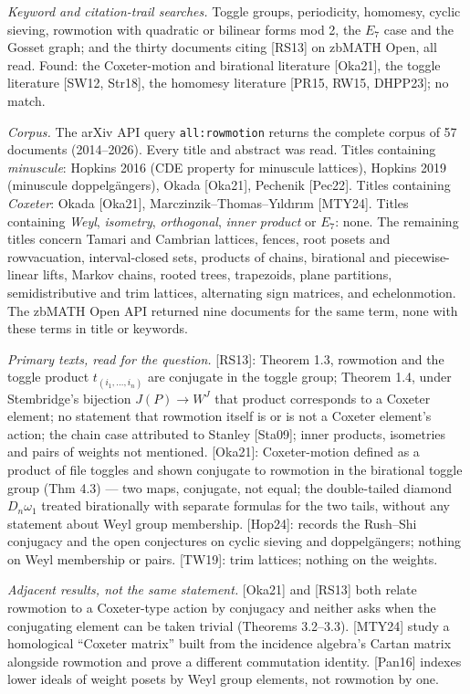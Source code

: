 \documentclass[
]{article}
\newcounter{none} %
\begin{document}
\emph{Keyword and citation-trail searches.} Toggle groups, periodicity,
homomesy, cyclic sieving, rowmotion with quadratic or bilinear forms mod
2, the \(E_7\) case and the Gosset graph; and the thirty documents
citing {[}RS13{]} on zbMATH Open, all read. Found: the Coxeter-motion
and birational literature {[}Oka21{]}, the toggle literature {[}SW12,
Str18{]}, the homomesy literature {[}PR15, RW15, DHPP23{]}; no match.

\emph{Corpus.} The arXiv API query \texttt{all:rowmotion} returns the
complete corpus of 57 documents (2014--2026). Every title and abstract
was read. Titles containing \emph{minuscule}: Hopkins 2016 (CDE property
for minuscule lattices), Hopkins 2019 (minuscule doppelgängers), Okada
{[}Oka21{]}, Pechenik {[}Pec22{]}. Titles containing \emph{Coxeter}:
Okada {[}Oka21{]}, Marczinzik--Thomas--Yıldırım {[}MTY24{]}. Titles
containing \emph{Weyl}, \emph{isometry}, \emph{orthogonal}, \emph{inner
product} or \emph{\(E_7\)}: none. The remaining titles concern Tamari
and Cambrian lattices, fences, root posets and rowvacuation,
interval-closed sets, products of chains, birational and
piecewise-linear lifts, Markov chains, rooted trees, trapezoids, plane
partitions, semidistributive and trim lattices, alternating sign
matrices, and echelonmotion. The zbMATH Open API returned nine documents
for the same term, none with these terms in title or keywords.

\emph{Primary texts, read for the question.} {[}RS13{]}: Theorem 1.3,
rowmotion and the toggle product \(t_{(i_1,\dots,i_n)}\) are conjugate
in the toggle group; Theorem 1.4, under Stembridge's bijection
\(J(P) \to W^J\) that product corresponds to a Coxeter element; no
statement that rowmotion itself is or is not a Coxeter element's action;
the chain case attributed to Stanley {[}Sta09{]}; inner products,
isometries and pairs of weights not mentioned. {[}Oka21{]}:
Coxeter-motion defined as a product of file toggles and shown conjugate
to rowmotion in the birational toggle group (Thm 4.3) --- two maps,
conjugate, not equal; the double-tailed diamond \(D_n\omega_1\) treated
birationally with separate formulas for the two tails, without any
statement about Weyl group membership. {[}Hop24{]}: records the
Rush--Shi conjugacy and the open conjectures on cyclic sieving and
doppelgängers; nothing on Weyl membership or pairs. {[}TW19{]}: trim
lattices; nothing on the weights.

\emph{Adjacent results, not the same statement.} {[}Oka21{]} and
{[}RS13{]} both relate rowmotion to a Coxeter-type action by conjugacy
and neither asks when the conjugating element can be taken trivial
(Theorems 3.2--3.3). {[}MTY24{]} study a homological ``Coxeter matrix''
built from the incidence algebra's Cartan matrix alongside rowmotion and
prove a different commutation identity. {[}Pan16{]} indexes lower ideals
of weight posets by Weyl group elements, not rowmotion by one.
\end{document}
